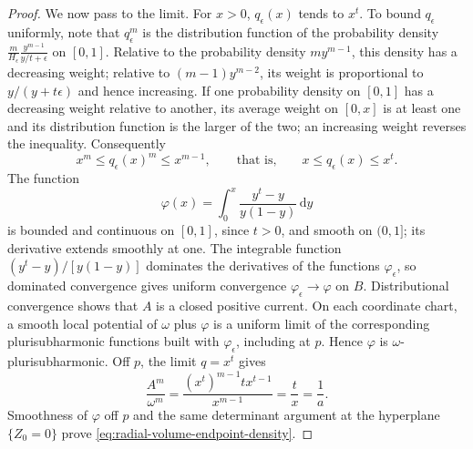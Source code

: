 \begin{proof}
We now pass to the limit. For $x>0$, $q_\epsilon(x)$ tends to $x^t$. To bound $q_\epsilon$ uniformly, note that $q_\epsilon^m$ is the distribution function of the probability density $\frac{m}{H_\epsilon}\frac{y^{m-1}}{y/t+\epsilon}$ on $[0,1]$. Relative to the probability density $my^{m-1}$, this density has a decreasing weight; relative to $(m-1)y^{m-2}$, its weight is proportional to $y/(y+t\epsilon)$ and hence increasing. If one probability density on $[0,1]$ has a decreasing weight relative to another, its average weight on $[0,x]$ is at least one and its distribution function is the larger of the two; an increasing weight reverses the inequality. Consequently
\[
 x^m\leq q_\epsilon(x)^m\leq x^{m-1},
 \qquad\text{that is,}\qquad x\leq q_\epsilon(x)\leq x^t.
\]
The function
\[
 \varphi(x)=\int_0^x\frac{y^t-y}{y(1-y)}\,\mathrm{d}y
\]
is bounded and continuous on $[0,1]$, since $t>0$, and smooth on $(0,1]$; its derivative extends smoothly at one. The integrable function $(y^t-y)/[y(1-y)]$ dominates the derivatives of the functions $\varphi_\epsilon$, so dominated convergence gives uniform convergence $\varphi_\epsilon\to\varphi$ on $B$. Distributional convergence shows that $A$ is a closed positive current. On each coordinate chart, a smooth local potential of $\omega$ plus $\varphi$ is a uniform limit of the corresponding plurisubharmonic functions built with $\varphi_\epsilon$, including at $p$. Hence $\varphi$ is $\omega$-plurisubharmonic. Off $p$, the limit $q=x^t$ gives
\[
 \frac{A^m}{\omega^m}
 =\frac{(x^t)^{m-1}t x^{t-1}}{x^{m-1}}=\frac t x=\frac1a.
\]
Smoothness of $\varphi$ off $p$ and the same determinant argument at the hyperplane $\{Z_0=0\}$ prove \eqref{eq:radial-volume-endpoint-density}.
\end{proof}

